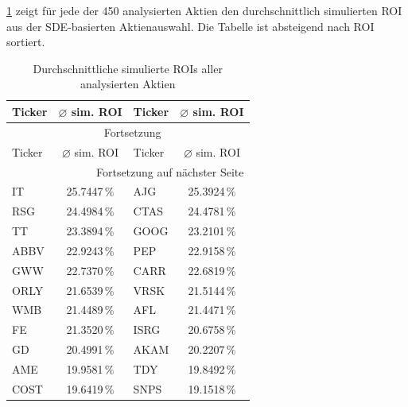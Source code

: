 \cref{tab:all_roi} zeigt für jede der 450 analysierten Aktien den durchschnittlich simulierten \ac{ROI} aus der SDE-basierten Aktienauswahl. Die Tabelle ist absteigend nach \ac{ROI} sortiert.

\begin{longtable}{l c | l c}
    \caption{Durchschnittliche simulierte ROIs aller analysierten Aktien}\label{tab:all_roi} \\
    \toprule
    Ticker & $\varnothing$ sim. ROI & Ticker & $\varnothing$ sim. ROI                        \\
    \midrule
    \endfirsthead
    \multicolumn{4}{c}{\tablename\ \thetable{} Fortsetzung}                                  \\
    \toprule
    Ticker & $\varnothing$ sim. ROI & Ticker & $\varnothing$ sim. ROI                        \\
    \midrule
    \endhead
    \midrule
    \multicolumn{4}{r}{Fortsetzung auf nächster Seite}                                       \\
    \endfoot
    \bottomrule
    \endlastfoot
    IT     & 25.7447\,\%            & AJG    & 25.3924\,\%                                   \\
    RSG    & 24.4984\,\%            & CTAS   & 24.4781\,\%                                   \\
    TT     & 23.3894\,\%            & GOOG   & 23.2101\,\%                                   \\
    ABBV   & 22.9243\,\%            & PEP    & 22.9158\,\%                                   \\
    GWW    & 22.7370\,\%            & CARR   & 22.6819\,\%                                   \\
    ORLY   & 21.6539\,\%            & VRSK   & 21.5144\,\%                                   \\
    WMB    & 21.4489\,\%            & AFL    & 21.4471\,\%                                   \\
    FE     & 21.3520\,\%            & ISRG   & 20.6758\,\%                                   \\
    GD     & 20.4991\,\%            & AKAM   & 20.2207\,\%                                   \\
    AME    & 19.9581\,\%            & TDY    & 19.8492\,\%                                   \\
    COST   & 19.6419\,\%            & SNPS   & 19.1518\,\%                                   \\

\end{longtable}

